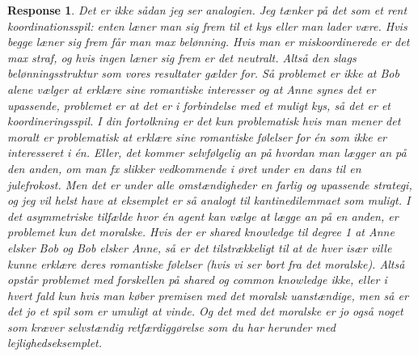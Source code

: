 \documentclass[a4paper]{article}
\newtheorem{response}{Response}
\newenvironment{tobo}{\smallskip \noindent \color{yellow!80!black!80}}{\color{black}\smallskip}
\begin{document}
\begin{response}
\begin{tobo}
Det er ikke sådan jeg ser analogien. Jeg tænker på det som et rent koordinationsspil: enten læner man sig frem til et kys eller man lader være. Hvis begge læner sig frem får man max belønning. Hvis man er miskoordinerede er det max straf, og hvis ingen læner sig frem er det neutralt. Altså den slags belønningsstruktur som vores resultater gælder for. Så problemet er ikke at Bob alene vælger at erklære sine romantiske interesser og at Anne synes det er upassende, problemet er at det er i forbindelse med et muligt kys, så det er et koordineringsspil. I din fortolkning er det kun problematisk hvis man mener det moralt er problematisk at erklære sine romantiske følelser for én som ikke er interesseret i én. Eller, det kommer selvfølgelig an på hvordan man lægger an på den anden, om man fx slikker vedkommende i øret under en dans til en julefrokost. Men det er under alle omstændigheder en farlig og upassende strategi, og jeg vil helst have at eksemplet er så analogt til kantinedilemmaet som muligt. I det asymmetriske tilfælde hvor én agent kan vælge at lægge an på en anden, er problemet kun det moralske. Hvis der er shared knowledge til degree 1 at Anne elsker Bob og Bob elsker Anne, så er det tilstrækkeligt til at de hver især ville kunne erklære deres romantiske følelser (hvis vi ser bort fra det moralske). Altså opstår problemet med forskellen på shared og common knowledge ikke, eller i hvert fald kun hvis man køber premisen med det moralsk uanstændige, men så er det jo et spil som er umuligt at vinde. Og det med det moralske er jo også noget som kræver selvstændig retfærdiggørelse som du har herunder med lejlighedseksemplet. 
\end{tobo} 
 

\end{response}
\end{document}

